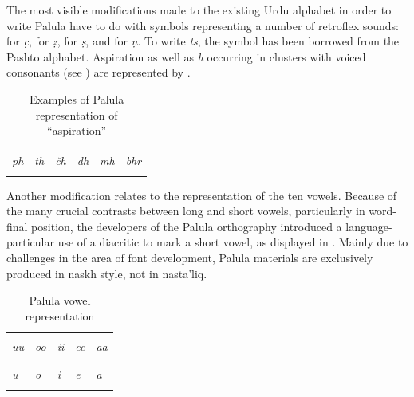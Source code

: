 The most visible modifications made to the existing Urdu alphabet in order to write Palula have to do with symbols representing a number of retroflex sounds: {\large{}}  for \textit{c̣}, {\large{}} for \textit{ẓ}, {\large{}} for \textit{ṣ}, and {\large{}} for \textit{ṇ}. To write \textit{ts}, the symbol {\large{}} has been borrowed from the Pashto alphabet. Aspiration as well as \textit{h} occurring in clusters with voiced consonants (see ) are represented by {\large{}}.


\begin{table}
\caption{Examples of Palula representation of ``aspiration''}
\begin{tabularx}{\textwidth}{ Q Q Q Q Q Q }
\lsptoprule
\LARGE{}
&\LARGE{}
&\LARGE{}
&\LARGE{}
&\LARGE{}
&\LARGE{}\\
\textit{ph} &
\textit{th} &
\textit{čh} &
\textit{dh} &
\textit{mh} &
\textit{bhr}\\\lspbottomrule
\end{tabularx}
\label{tab:1-4bb}
\end{table}


Another modification relates to the representation of the ten vowels. Because of the many crucial contrasts between long and short vowels, particularly in word-final position, the developers of the Palula orthography introduced a language-particular use of a diacritic {\large{}} to mark a short vowel, as displayed in . Mainly due to challenges in the area of font development, Palula materials are exclusively produced in naskh style, not in nasta’liq.


\begin{table}
\caption{Palula vowel representation}
\begin{tabularx}{\textwidth}{ Q Q Q Q Q }
\lsptoprule
\LARGE{}
&\LARGE{}
&\LARGE{}
&\LARGE{}
&\LARGE{}\\
\textit{uu} &
\textit{oo} &
\textit{ii} &
\textit{ee} &
\textit{aa}\\
\\
\LARGE{}
&\LARGE{}
&\LARGE{}
&\LARGE{}
&\LARGE{}\\
\textit{u} &
\textit{o} &
\textit{i} &
\textit{e} &
\textit{a}\\\lspbottomrule
\end{tabularx}
\label{tab:1-4c}
\end{table}


